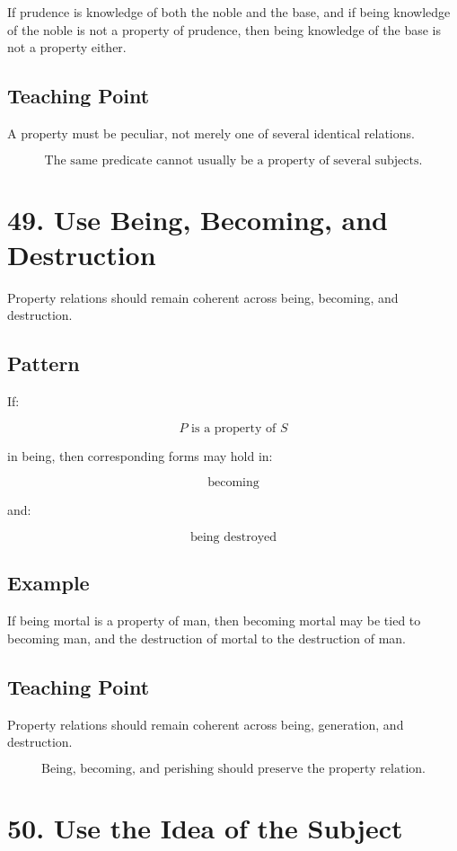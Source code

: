 \documentclass[12pt]{article}
\begin{document}
If prudence is knowledge of both the noble and the base, and if being knowledge
of the noble is not a property of prudence, then being knowledge of the base is
not a property either.

\subsection*{Teaching Point}

A property must be peculiar, not merely one of several identical relations.

\[
\boxed{
\text{The same predicate cannot usually be a property of several subjects.}
}
\]

\section*{49. Use Being, Becoming, and Destruction}

Property relations should remain coherent across being, becoming, and
destruction.

\subsection*{Pattern}

If:

\[
P \text{ is a property of } S
\]

in being, then corresponding forms may hold in:

\[
\text{becoming}
\]

and:

\[
\text{being destroyed}
\]

\subsection*{Example}

If being mortal is a property of man, then becoming mortal may be tied to
becoming man, and the destruction of mortal to the destruction of man.

\subsection*{Teaching Point}

Property relations should remain coherent across being, generation, and
destruction.

\[
\boxed{
\text{Being, becoming, and perishing should preserve the property relation.}
}
\]

\section*{50. Use the Idea of the Subject}
\end{document}
